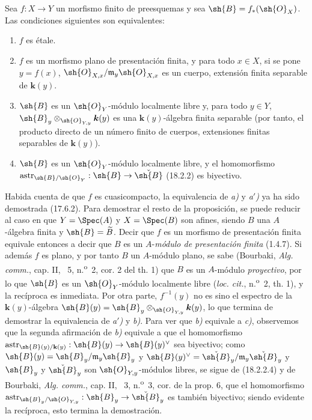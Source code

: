 
\begin{proposition}[18.2.3]
\label{IV.18.2.3}
Sea $f:X\to Y$ un morfismo \textup{finito} de preesquemas y sea $\sh{B}=f_*(\sh{O}_X)$. Las condiciones siguientes son equivalentes:
\begin{enumerate}
  \item[\textup{a)}] $f$ es étale.
  \item[\textup{a$'$)}] $f$ es un morfismo plano de presentación finita, y para todo $x\in X$, si se pone $y=f(x)$, $\sh{O}_{X,x}/\mathfrak m_y\sh{O}_{X,x}$ es un cuerpo, extensión finita separable de $\boldsymbol{k}(y)$.
  \item[\textup{b)}] $\sh{B}$ es un $\sh{O}_Y$-módulo localmente libre y, para todo $y\in Y$, $\sh{B}_y\otimes_{\sh{O}_{Y,y}}\boldsymbol{k}(y)$ es una $\boldsymbol{k}(y)$-álgebra finita separable \textup{(por tanto, el producto directo de un número finito de cuerpos, extensiones finitas separables de $\boldsymbol{k}(y)$)}.
  \item[\textup{c)}] $\sh{B}$ es un $\sh{O}_Y$-módulo localmente libre, y el homomorfismo $\operatorname{astr}_{\sh{B}/\sh{O}_Y}:\sh{B}\to\check{\sh{B}}$ \textup{(18.2.2)} es biyectivo.
\end{enumerate}
\end{proposition}

Habida cuenta de que $f$ es cuasicompacto, la equivalencia de \emph{a)} y \emph{a$'$)} ya ha sido demostrada (17.6.2). Para demostrar el resto de la proposición, se puede reducir al caso en que $Y=\Spec(A)$ y $X=\Spec(B)$ son afines, siendo $B$ una $A$-álgebra finita y $\sh{B}=\widetilde B$. Decir que $f$ es un morfismo de presentación finita equivale entonces a decir que $B$ es un $A$-\emph{módulo de presentación finita} (1.4.7). Si además $f$ es plano, y por tanto $B$ un $A$-módulo plano, se sabe (Bourbaki, \emph{Alg. comm.}, cap. II, \textsection~5, n.\textsuperscript{o}~2, cor. 2 del th. 1) que $B$ es un $A$-módulo \emph{proyectivo}, por lo que $\sh{B}$ es un $\sh{O}_Y$-módulo localmente libre (\emph{loc. cit.}, n.\textsuperscript{o}~2, th. 1), y la recíproca es inmediata. Por otra parte, $f^{-1}(y)$ no es sino el espectro de la $\boldsymbol{k}(y)$-álgebra $\sh{B}(y)=\sh{B}_y\otimes_{\sh{O}_{Y,y}}\boldsymbol{k}(y)$, lo que termina de demostrar la equivalencia de \emph{a$'$)} y \emph{b)}. Para ver que \emph{b)} equivale a \emph{c)}, observemos que la segunda afirmación de \emph{b)} equivale a que el homomorfismo $\operatorname{astr}_{\sh{B}(y)/\mathbf{k}(y)}:\sh{B}(y)\to\sh{B}(y)^\vee$ sea biyectivo; como $\sh{B}(y)=\sh{B}_y/\mathfrak m_y\sh{B}_y$ y $\sh{B}(y)^\vee=\check{\sh{B}}_y/\mathfrak m_y\check{\sh{B}}_y$ y $\sh{B}_y$ y $\check{\sh{B}}_y$ son $\sh{O}_{Y,y}$-módulos libres, se sigue de (18.2.2.4) y de Bourbaki, \emph{Alg. comm.}, cap. II, \textsection~3, n.\textsuperscript{o}~3, cor. de la prop. 6, que el homomorfismo $\operatorname{astr}_{\sh{B}_y/\sh{O}_{Y,y}}:\sh{B}_y\to\check{\sh{B}}_y$ es también biyectivo; siendo evidente la recíproca, esto termina la demostración.

